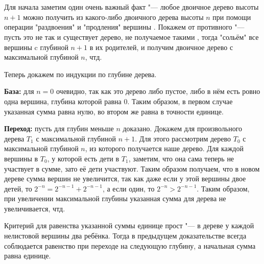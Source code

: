 \section{}
	Для начала заметим один очень важный факт "--- любое двоичное дерево высоты $n + 1$ можно получить из какого-либо двоичного дерева высоты $n$ при помощи операции "раздвоения" и "продления" вершины . Покажем от противного "--- пусть это не так и существует дерево, не получаемое такими , тогда "сольём" все вершины c глубиной $n + 1$ в их родителей, и получим двоичное дерево с максимальной глубиной $n$, чтд. 

	Теперь докажем по индукции по глубине дерева.
	
	\textbf{База:} для $n = 0$ очевидно, так как это дерево либо пустое, либо в нём есть ровно одна вершина, глубина которой равна $0$. Таким образом, в первом случае указанная сумма равна нулю, во втором же равна в точности единице.
	
	\textbf{Переход:} пусть для глубин меньше $n$ доказано. Докажем для произвольного дерева $T_1$ с максимальной глубиной $n + 1$. Для этого рассмотрим дерево $T_0$ с максимальной глубиной $n$, из которого получается наше дерево. Для каждой вершины в $T_0$, у которой есть дети в $T_1$, заметим, что она сама теперь не участвует в сумме, зато её дети участвуют. Таким образом получаем, что в новом дереве сумма вершин не увеличится, так как даже если у этой вершины двое детей, то $2^{-n} = 2^{-n-1} + 2^{-n-1}$, а если один, то $2^{-n} > 2^{-n-1}$. Таким образом, при увеличении максимальной глубины указанная сумма для дерева не увеличивается, чтд.
	
	Критерий для равенства указанной суммы единице прост "--- в дереве у каждой нелистовой вершины два ребёнка. Тогда в предыдущем доказательстве всегда соблюдается равенство при переходе на следующую глубину, а начальная сумма равна единице.